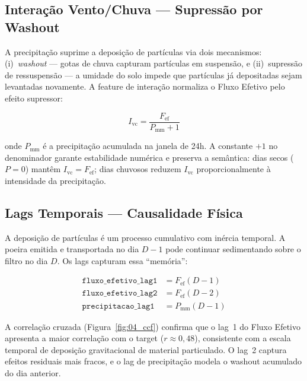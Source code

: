 \documentclass[12pt, a4paper]{article}
\newcommand{\feature}[1]{\texttt{#1}}
\begin{document}
\subsection{Interação Vento/Chuva --- Supressão por Washout}
\label{subsec:interacao}

A precipitação suprime a deposição de partículas via dois mecanismos:
(i)~\textit{washout} --- gotas de chuva capturam partículas em
suspensão, e (ii)~supressão de ressuspensão --- a umidade do solo
impede que partículas já depositadas sejam levantadas novamente.
A feature de interação normaliza o Fluxo Efetivo pelo efeito
supressor:

\begin{equation}
    I_{\text{vc}} = \frac{F_{\text{ef}}}{P_{\text{mm}} + 1}
    \label{eq:interacao}
\end{equation}

onde $P_{\text{mm}}$ é a precipitação acumulada na janela de 24h.
A constante $+1$ no denominador garante estabilidade numérica e
preserva a semântica: dias secos ($P = 0$) mantêm
$I_{\text{vc}} = F_{\text{ef}}$; dias chuvosos reduzem $I_{\text{vc}}$
proporcionalmente à intensidade da precipitação.

\subsection{Lags Temporais --- Causalidade Física}
\label{subsec:lags}

A deposição de partículas é um processo cumulativo com inércia temporal.
A poeira emitida e transportada no dia $D-1$ pode continuar
sedimentando sobre o filtro no dia $D$. Os lags capturam essa
``memória'':

\begin{equation}
    \begin{aligned}
        \feature{fluxo\_efetivo\_lag1} &= F_{\text{ef}}(D - 1) \\[3pt]
        \feature{fluxo\_efetivo\_lag2} &= F_{\text{ef}}(D - 2) \\[3pt]
        \feature{precipitacao\_lag1}   &= P_{\text{mm}}(D - 1)
    \end{aligned}
    \label{eq:lags}
\end{equation}

A correlação cruzada (Figura~\ref{fig:04_ccf}) confirma que o
lag~1 do Fluxo Efetivo apresenta a maior correlação com o target
($r \approx 0{,}48$), consistente com a escala temporal de deposição
gravitacional de material particulado. O lag~2 captura efeitos
residuais mais fracos, e o lag de precipitação modela o washout
acumulado do dia anterior.
\end{document}
